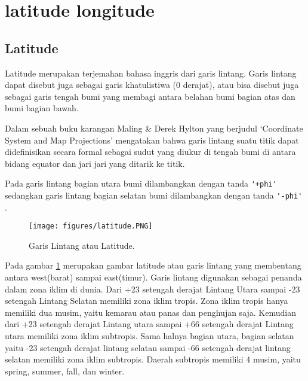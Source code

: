 
\section{latitude longitude}

\subsection{Latitude}
Latitude merupakan terjemahan bahasa inggris dari garis lintang. Garis lintang dapat disebut juga sebagai garis khatulistiwa (0 derajat), atau bisa disebut juga sebagai garis tengah bumi yang membagi antara belahan bumi bagian atas dan bumi bagian bawah.

Dalam sebuah buku karangan Maling \& Derek Hylton yang berjudul `Coordinate System and Map Projections' mengatakan bahwa garis lintang suatu titik dapat didefinisikan secara formal sebagai sudut yang diukur di tengah bumi di antara bidang equator dan jari jari yang ditarik ke titik. 

Pada garis lintang bagian utara bumi dilambangkan dengan tanda \verb|'+phi'| 
sedangkan garis lintang bagian selatan bumi dilambangkan dengan tanda \verb|'-phi'| 
\cite{maling2013coordinate}. 

	\begin{figure}[ht]
	\centerline{\texttt{[image: figures/latitude.PNG]}}
	\caption{Garis Lintang atau Latitude.}
	\label{latitude}
	\end{figure}
Pada gambar \ref{latitude} merupakan gambar latitude atau garis lintang yang membentang antara west(barat) sampai east(timur).
Garis lintang digunakan sebagai penanda dalam zona iklim di dunia. Dari +23 setengah derajat Lintang Utara sampai -23 setengah Lintang Selatan memiliki zona iklim tropis. Zona iklim tropis hanya memiliki dua musim, yaitu kemarau atau panas dan penghujan saja. Kemudian dari +23 setengah derajat Lintang utara sampai +66 setengah derajat Lintang utara memiliki zona iklim subtropis. Sama halnya bagian utara, bagian selatan yaitu -23 setengah derajat lintang selatan sampai -66 setengah derajat lintang selatan memiliki zona iklim subtropis. Daerah subtropis memiliki 4 musim, yaitu spring, summer, fall, dan winter. 

